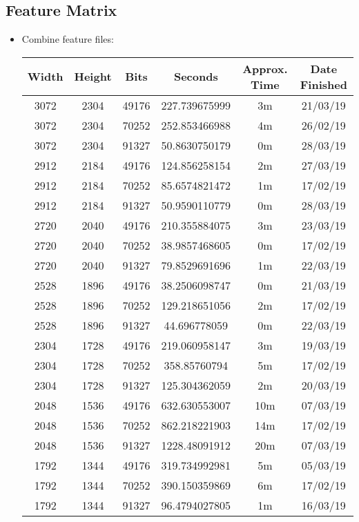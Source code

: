 \newpage
\subsection{Feature Matrix}
\begin{itemize}
  \item Combine feature files:
  \begin{center}
  \begin{tabular}{ c c c | c c c }
  Width & Height & Bits & Seconds & Approx. Time & Date Finished \\ \hline
  3072 & 2304 & 49176 & 227.739675999 & 3m & 21/03/19 \\
  3072 & 2304 & 70252 & 252.853466988 & 4m & 26/02/19 \\
  3072 & 2304 & 91327 & 50.8630750179 & 0m & 28/03/19 \\
  2912 & 2184 & 49176 & 124.856258154 & 2m & 27/03/19 \\
  2912 & 2184 & 70252 & 85.6574821472 & 1m & 17/02/19 \\
  2912 & 2184 & 91327 & 50.9590110779 & 0m & 28/03/19 \\
  2720 & 2040 & 49176 & 210.355884075 & 3m & 23/03/19 \\
  2720 & 2040 & 70252 & 38.9857468605 & 0m & 17/02/19 \\
  2720 & 2040 & 91327 & 79.8529691696 & 1m & 22/03/19 \\
  2528 & 1896 & 49176 & 38.2506098747 & 0m & 21/03/19 \\
  2528 & 1896 & 70252 & 129.218651056 & 2m & 17/02/19 \\
  2528 & 1896 & 91327 & 44.696778059 & 0m & 22/03/19 \\
  2304 & 1728 & 49176 & 219.060958147 & 3m & 19/03/19 \\
  2304 & 1728 & 70252 & 358.85760794 & 5m & 17/02/19 \\
  2304 & 1728 & 91327 & 125.304362059 & 2m & 20/03/19 \\
  2048 & 1536 & 49176 & 632.630553007 & 10m & 07/03/19 \\
  2048 & 1536 & 70252 & 862.218221903 & 14m & 17/02/19 \\
  2048 & 1536 & 91327 & 1228.48091912 & 20m & 07/03/19 \\
  1792 & 1344 & 49176 & 319.734992981 & 5m & 05/03/19 \\
  1792 & 1344 & 70252 & 390.150359869 & 6m & 17/02/19 \\
  1792 & 1344 & 91327 & 96.4794027805 & 1m & 16/03/19 \\

\end{tabular}
\end{center}
\end{itemize}
